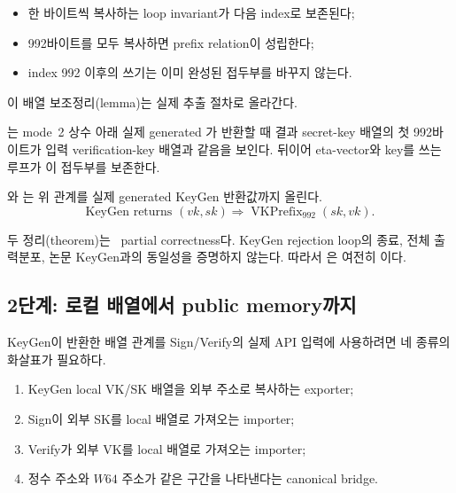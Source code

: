 \begin{itemize}
  \item 한 바이트씩 복사하는 loop invariant가 다음 index로 보존된다;
  \item 992바이트를 모두 복사하면 prefix relation이 성립한다;
  \item index 992 이후의 쓰기는 이미 완성된 접두부를 바꾸지 않는다.
\end{itemize}

이 배열 보조정리(lemma)는 실제 추출 절차로 올라간다.

\begin{verified}
는 mode~2 상수 아래 실제 generated
가 반환할 때 결과 secret-key 배열의 첫 992바이트가
입력 verification-key 배열과 같음을 보인다. 뒤이어 eta-vector와 key를 쓰는
루프가 이 접두부를 보존한다.
\end{verified}

\begin{verified}
와
는 위 관계를 실제 generated
KeyGen 반환값까지 올린다.
\[
  \text{KeyGen returns }(vk,sk)
  \Longrightarrow \operatorname{VKPrefix}_{992}(sk,vk).
\]
\end{verified}

두 정리(theorem)는 \statusproved\ partial correctness다. KeyGen rejection loop의
종료, 전체 출력분포, 논문 KeyGen과의 동일성을 증명하지 않는다. 따라서
은 여전히 \statuspartial 이다.

\subsection{2단계: 로컬 배열에서 public memory까지}

KeyGen이 반환한 배열 관계를 Sign/Verify의 실제 API 입력에 사용하려면 네 종류의
화살표가 필요하다.

\begin{enumerate}
  \item KeyGen local VK/SK 배열을 외부 주소로 복사하는 exporter;
  \item Sign이 외부 SK를 local 배열로 가져오는 importer;
  \item Verify가 외부 VK를 local 배열로 가져오는 importer;
  \item 정수 주소와 \(W64\) 주소가 같은 구간을 나타낸다는 canonical bridge.
\end{enumerate}

